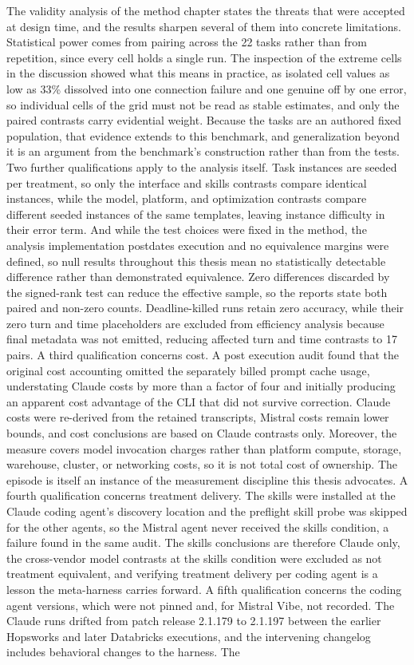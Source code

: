 \documentclass[
english,                 %
bibtex,                  %
]{kththesis}
\numberwithin{listing}{chapter}
\begin{document}
The validity analysis of the method chapter states the threats that were accepted at design time, and the results sharpen several of them into concrete limitations. Statistical power comes from pairing across the 22 tasks rather than from repetition, since every cell holds a single run. The inspection of the extreme cells in the discussion showed what this means in practice, as isolated cell values as low as 33\% dissolved into one connection failure and one genuine off by one error, so individual cells of the grid must not be read as stable estimates, and only the paired contrasts carry evidential weight. Because the tasks are an authored fixed population, that evidence extends to this benchmark, and generalization beyond it is an argument from the benchmark's construction rather than from the tests. Two further qualifications apply to the analysis itself. Task instances are seeded per treatment, so only the interface and skills contrasts compare identical instances, while the model, platform, and optimization contrasts compare different seeded instances of the same templates, leaving instance difficulty in their error term. And while the test choices were fixed in the method, the analysis implementation postdates execution and no equivalence margins were defined, so null results throughout this thesis mean no statistically detectable difference rather than demonstrated equivalence. Zero differences discarded by the signed-rank test can reduce the effective sample, so the reports state both paired and non-zero counts. Deadline-killed runs retain zero accuracy, while their zero turn and time placeholders are excluded from efficiency analysis because final metadata was not emitted, reducing affected turn and time contrasts to 17 pairs. A third qualification concerns cost. A post execution audit found that the original cost accounting omitted the separately billed prompt cache usage, understating Claude costs by more than a factor of four and initially producing an apparent cost advantage of the \gls{CLI} that did not survive correction. Claude costs were re-derived from the retained transcripts, Mistral costs remain lower bounds, and cost conclusions are based on Claude contrasts only. Moreover, the measure covers model invocation charges rather than platform compute, storage, warehouse, cluster, or networking costs, so it is not total cost of ownership. The episode is itself an instance of the measurement discipline this thesis advocates. A fourth qualification concerns treatment delivery. The skills were installed at the Claude coding agent's discovery location and the preflight skill probe was skipped for the other agents, so the Mistral agent never received the skills condition, a failure found in the same audit. The skills conclusions are therefore Claude only, the cross-vendor model contrasts at the skills condition were excluded as not treatment equivalent, and verifying treatment delivery per coding agent is a lesson the meta-harness carries forward. A fifth qualification concerns the coding agent versions, which were not pinned and, for Mistral Vibe, not recorded. The Claude runs drifted from patch release 2.1.179 to 2.1.197 between the earlier Hopsworks and later Databricks executions, and the intervening changelog includes behavioral changes to the harness. The 
\end{document}
